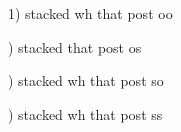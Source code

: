 \documentclass{article}
\begin{document}

1) stacked wh that post oo

\begin{center}

\end{center}

) stacked that post os
\begin{center}

\end{center}

) stacked wh that post so
\begin{center}

\end{center}

) stacked wh that post ss
\begin{center}

\end{center}
\end{document}
